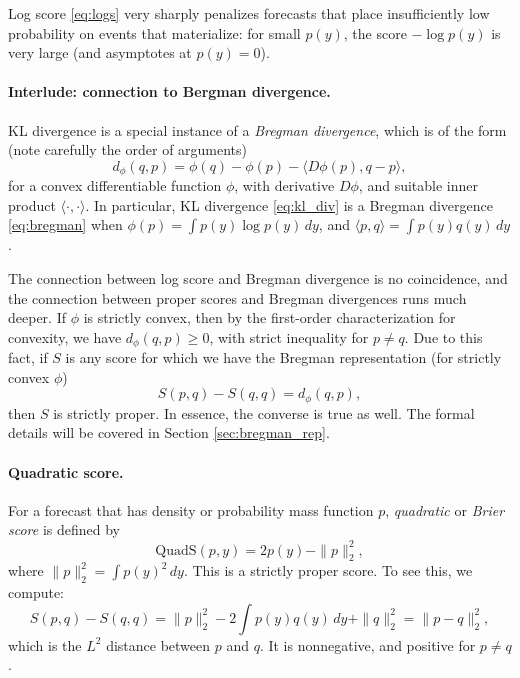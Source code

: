 \documentclass{article}
\begin{document}
Log score \eqref{eq:logs} very sharply penalizes forecasts that place
insufficiently low probability on events that materialize: for small $p(y)$, the
score $-\log p(y)$ is very large (and asymptotes at $p(y) = 0$).  

\paragraph{Interlude: connection to Bergman divergence.}

KL divergence is a special instance of a \emph{Bregman divergence}, which is of
the form (note carefully the order of arguments)
\begin{equation}
\label{eq:bregman}
d_\phi(q,p) = \phi(q) - \phi(p) - \langle D\phi(p), q - p \rangle,
\end{equation}
for a convex differentiable function $\phi$, with derivative $D\phi$, and
suitable inner product $\langle \cdot, \cdot \rangle$. In particular, KL
divergence \eqref{eq:kl_div} is a Bregman divergence \eqref{eq:bregman} when
$\phi(p) = \int p(y) \log p(y) \, dy$, and $\langle p, q \rangle = \int p(y)
q(y) \, dy$.   

The connection between log score and Bregman divergence is no coincidence, and
the connection between proper scores and Bregman divergences runs much
deeper. If $\phi$ is strictly convex, then by the first-order characterization
for convexity, we have $d_\phi(q,p) \geq 0$, with strict inequality for $p \not= 
q$. Due to this fact, if $S$ is any score for which we have the Bregman
representation (for strictly convex $\phi$)   
\begin{equation}
\label{eq:bregman_rep}
S(p, q) - S(q, q) = d_\phi(q, p),
\end{equation}
then $S$ is strictly proper. In essence, the converse is true as well. The
formal details will be covered in Section \ref{sec:bregman_rep}. 

\paragraph{Quadratic score.}

For a forecast that has density or probability mass function $p$,
\emph{quadratic} or \emph{Brier score} is defined by   
\begin{equation}
\label{eq:quads}
\mathrm{QuadS}(p, y) = 2p(y) - \|p\|_2^2,
\end{equation}
where $\|p\|_2^2 = \int p(y)^2 \, dy$. This is a strictly proper score. To see
this, we compute:  
\[
S(p, q) - S(q, q) = \|p\|_2^2 - 2 \int p(y) q(y) \, dy + \|q\|_2^2 =
\|p-q\|_2^2,
\]
which is the $L^2$ distance between $p$ and $q$. It is nonnegative, and
positive for $p \not= q$.  
\end{document}
